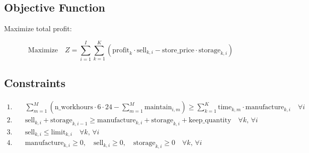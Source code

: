 \documentclass{article}
\begin{document}
\subsection*{Objective Function}
Maximize total profit:

\[
\text{Maximize} \quad Z = \sum_{i=1}^{I} \sum_{k=1}^{K} \left( \text{profit}_k \cdot \text{sell}_{k,i} - \text{store\_price} \cdot \text{storage}_{k,i} \right)
\]

\subsection*{Constraints}
\begin{align*}
\text{1.} & \quad \sum_{m=1}^{M} \left( \text{n\_workhours} \cdot 6 \cdot 24 - \sum_{m=1}^{M} \text{maintain}_{i,m} \right) \geq \sum_{k=1}^{K} \text{time}_{k,m} \cdot \text{manufacture}_{k,i} \quad \forall i \\
\text{2.} & \quad \text{sell}_{k,i} + \text{storage}_{k,i-1} \geq \text{manufacture}_{k,i} + \text{storage}_{k,i} + \text{keep\_quantity} \quad \forall k, \, \forall i \\
\text{3.} & \quad \text{sell}_{k,i} \leq \text{limit}_{k,i} \quad \forall k, \, \forall i \\
\text{4.} & \quad \text{manufacture}_{k,i} \geq 0, \quad \text{sell}_{k,i} \geq 0, \quad \text{storage}_{k,i} \geq 0 \quad \forall k, \, \forall i
\end{align*}
\end{document}
